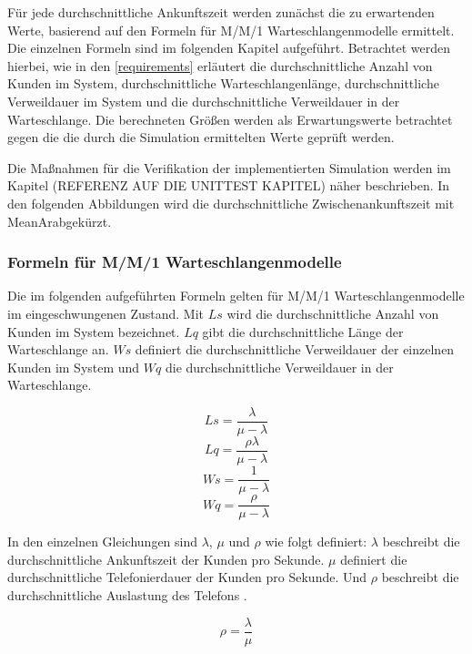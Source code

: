 Für jede durchschnittliche Ankunftszeit werden zunächst die zu erwartenden Werte, basierend auf den Formeln für M/M/1 Warteschlangenmodelle ermittelt. Die einzelnen Formeln sind im folgenden Kapitel aufgeführt. Betrachtet werden hierbei, wie in den \ref{requirements} erläutert die durchschnittliche Anzahl von Kunden im System, durchschnittliche Warteschlangenlänge, durchschnittliche Verweildauer im System und die durchschnittliche Verweildauer in der Warteschlange. Die berechneten Größen werden als Erwartungswerte betrachtet gegen die die durch die Simulation ermittelten Werte geprüft werden.

Die Maßnahmen für die Verifikation der implementierten Simulation werden im Kapitel (REFERENZ AUF DIE UNITTEST KAPITEL) näher beschrieben. In den folgenden Abbildungen wird die durchschnittliche Zwischenankunftszeit mit \glqq MeanAr\grqq abgekürzt.

\subsubsection{Formeln für M/M/1 Warteschlangenmodelle}
\label{Formeln}
Die im folgenden aufgeführten Formeln gelten für M/M/1 Warteschlangenmodelle im eingeschwungenen Zustand. Mit $Ls$ wird die durchschnittliche Anzahl von Kunden im System bezeichnet. $Lq$ gibt die durchschnittliche Länge der Warteschlange an. $Ws$ definiert die durchschnittliche Verweildauer der einzelnen Kunden im System und $Wq$ die durchschnittliche Verweildauer in der Warteschlange.

\begin{equation}
Ls=\frac{\lambda}{\mu - \lambda}
\end{equation}
\begin{equation}
Lq=\frac{\rho\lambda}{\mu - \lambda}
\end{equation}
\begin{equation}
Ws=\frac{1}{\mu - \lambda}
\end{equation}
\begin{equation}
Wq=\frac{\rho}{\mu - \lambda}
\end{equation}

In den einzelnen Gleichungen sind $\lambda$, $\mu$ und $\rho$ wie folgt definiert: $\lambda$ beschreibt die durchschnittliche Ankunftszeit der Kunden pro Sekunde. $\mu$ definiert die durchschnittliche Telefonierdauer der Kunden pro Sekunde. Und $\rho$ beschreibt die durchschnittliche Auslastung des Telefons \cite{MM1Formeln}.

\begin{equation}
\rho=\frac{\lambda}{\mu}
\end{equation}

